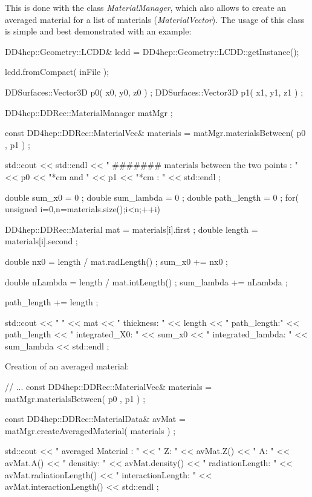 \documentclass[10pt,a4paper]{article}
\begin{document}
\noindent
This is done with the class {\em MaterialManager}, which also allows to
create an averaged material for a list of materials ({\em MaterialVector}).
The usage of this class is simple and best demonstrated with an example:

\begin{code}

  DD4hep::Geometry::LCDD& lcdd = DD4hep::Geometry::LCDD::getInstance();

  lcdd.fromCompact( inFile );

  DDSurfaces::Vector3D p0( x0, y0, z0 ) ;
  DDSurfaces::Vector3D p1( x1, y1, z1 ) ;

  DD4hep::DDRec::MaterialManager matMgr ;

  const DD4hep::DDRec::MaterialVec& materials = matMgr.materialsBetween( p0 , p1  ) ;
	
  std::cout  << std::endl  
             << " #######  materials between the two  points : " 
             << p0 << "*cm  and " << p1 << "*cm :  "  
             << std::endl ;

  double sum_x0 = 0 ;
  double sum_lambda = 0 ;
  double path_length = 0 ;
  for( unsigned i=0,n=materials.size();i<n;++i){

    DD4hep::DDRec::Material mat =  materials[i].first  ;
    double length = materials[i].second  ;

    double nx0 = length / mat.radLength()  ;
    sum_x0 += nx0 ;

    double nLambda = length / mat.intLength()  ;
    sum_lambda += nLambda ;

    path_length += length ;

    std::cout << "      "               << mat 
              << " thickness: "         << length 
              << " path_length:"        << path_length
              << " integrated_X0: "     << sum_x0 
              << " integrated_lambda: " << sum_lambda 
              <<  std::endl ;
  }

\end{code}

\noindent
Creation of an averaged material:

\begin{code}
  // ...
  const DD4hep::DDRec::MaterialVec& materials = matMgr.materialsBetween( p0 , p1  ) ;
	
  const DD4hep::DDRec::MaterialData& avMat = matMgr.createAveragedMaterial( materials ) ;

  std::cout << " averaged Material : " << " Z: " << avMat.Z() << " A: " << avMat.A() 
            << " densitiy: "           << avMat.density()
            << " radiationLength: "    << avMat.radiationLength() 
            << " interactionLength: "  << avMat.interactionLength()  
            << std::endl ;
\end{code}
\end{document}
